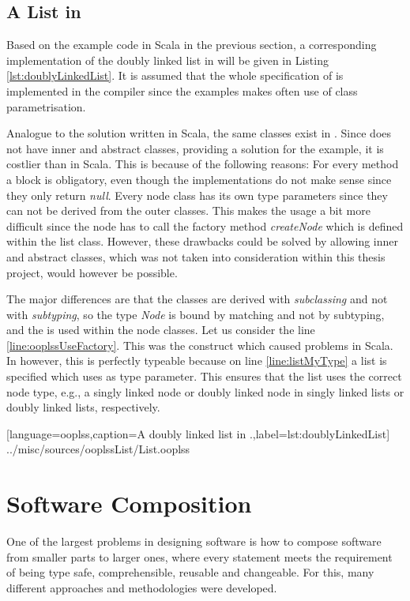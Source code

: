 \subsection{A List in \ooplss}
Based on the example code in Scala in the previous section, a corresponding
implementation of the doubly linked list in \ooplss will be given in Listing
\ref{lst:doublyLinkedList}. It is assumed that the whole specification
of \ooplss is implemented in the compiler since the examples makes often use
of class parametrisation.

Analogue to the solution written in Scala, the same classes exist in
\ooplss. Since \ooplss does not have inner and abstract classes, providing
a solution for the example, it is costlier than in Scala. This is because
of the following reasons: For every method a block is obligatory, even
though the implementations do not make sense since they only return
\emph{null}. Every node class has its own type parameters since they can
not be derived from the outer classes. This makes the usage a bit more
difficult since the node has to call the factory method \emph{createNode}
which is defined within the list class. However, these drawbacks could
be solved by allowing inner and abstract classes, which was not taken
into consideration within this thesis project, would however be possible.

The major differences are that the classes are derived with
\emph{subclassing} and not with \emph{subtyping}, so the type
\emph{Node} is bound by matching and not by subtyping, and the
\mytype is used within the node classes. Let us consider the line
\ref{line:ooplssUseFactory}. This was the construct which caused problems
in Scala. In \ooplss however, this is perfectly typeable because on
line \ref{line:listMyType} a list is specified which uses \mytype as
type parameter. This ensures that the list uses the correct node type,
e.g., a singly linked node or doubly linked node in singly
linked lists or doubly linked lists, respectively.


[language=ooplss,caption=A doubly linked list in \ooplss.,label=lst:doublyLinkedList]
{../misc/sources/ooplssList/List.ooplss}

\section{Software Composition}
One of the largest problems in designing software is how to compose
software from smaller parts to larger ones, where every statement
meets the requirement of being type safe, comprehensible, reusable and
changeable. For this, many different approaches and methodologies were
developed.

